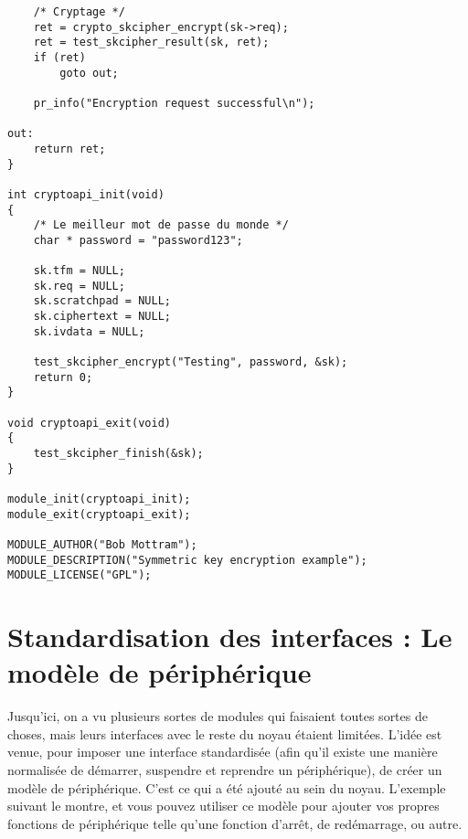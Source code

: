 \documentclass[11pt]{article}
\begin{document}
\begin{verbatim}
    /* Cryptage */
    ret = crypto_skcipher_encrypt(sk->req);
    ret = test_skcipher_result(sk, ret);
    if (ret)
        goto out;

    pr_info("Encryption request successful\n");

out:
    return ret;
}

int cryptoapi_init(void)
{
    /* Le meilleur mot de passe du monde */
    char * password = "password123";

    sk.tfm = NULL;
    sk.req = NULL;
    sk.scratchpad = NULL;
    sk.ciphertext = NULL;
    sk.ivdata = NULL;

    test_skcipher_encrypt("Testing", password, &sk);
    return 0;
}

void cryptoapi_exit(void)
{
    test_skcipher_finish(&sk);
}

module_init(cryptoapi_init);
module_exit(cryptoapi_exit);

MODULE_AUTHOR("Bob Mottram");
MODULE_DESCRIPTION("Symmetric key encryption example");
MODULE_LICENSE("GPL");
\end{verbatim}

\section*{Standardisation des interfaces : Le modèle de périphérique}
\label{sec-17}

Jusqu'ici, on a vu plusieurs sortes de modules qui faisaient toutes sortes de choses, mais leurs interfaces avec le reste du noyau étaient limitées. L'idée est venue, pour imposer une interface standardisée (afin qu'il existe une manière normalisée de démarrer, suspendre et reprendre un périphérique), de créer un modèle de périphérique. C'est ce qui a été ajouté au sein du noyau. L'exemple suivant le montre, et vous pouvez utiliser ce modèle pour ajouter vos propres fonctions de périphérique telle qu'une fonction d'arrêt, de redémarrage, ou autre.
\end{document}
